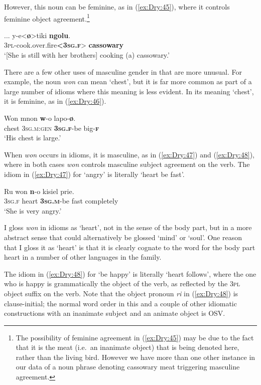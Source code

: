 \documentclass[output=collectionpaper]{langsci/langscibook}
\begin{document}
However, this noun can be feminine, as in (\ref{ex:Dry:45}), where it controls feminine object agreement.\footnote{The possibility of feminine agreement in (\ref{ex:Dry:45}) may be due to the fact that it is the meat (i.e.\ an inanimate object) that is being denoted here, rather than the living bird. However we have more than one other instance in our data of a noun phrase denoting cassowary meat triggering masculine agreement.}

\ea \label{ex:Dry:45}
\gll ...	y-e<\textbf{ø}>tiki	\textbf{ngolu}.\\
{} \textsc{3pl}-cook.over.fire\textbf{<\textsc{3sg.f}}> \textbf{cassowary}\\
\glt `[She is still with her brothers] cooking (a) cassowary.'
\z

There are a few other uses of masculine gender in  that are more unusual. For example, the noun \textit{won} can mean `chest', but it is far more common as part of a large number of idioms where this meaning is less evident. In its meaning `chest', it is feminine, as in (\ref{ex:Dry:46}).

\ea \label{ex:Dry:46}
\gll Won	mnon	\textbf{w}-o	lapo-\textbf{ø}.\\
chest \textsc{3sg.m:gen} \textbf{\textsc{3sg.f}}-be big-\textbf{\textsc{f}}\\
\glt `His chest is large.'
\z

When \textit{won} occurs in idioms, it is masculine, as in (\ref{ex:Dry:47}) and (\ref{ex:Dry:48}), where in both cases \textit{won} controls masculine subject agreement on the verb. The idiom in (\ref{ex:Dry:47}) for `angry' is literally `heart be fast'.

\ea \label{ex:Dry:47}
\gll Ru	won	\textbf{n}-o	kisiel	prie.\\
\textsc{3sg.f} heart \textbf{\textsc{3sg.m}}-be fast completely\\
\glt `She is very angry.'
\z

I gloss \textit{won} in idioms as `heart', not in the sense of the body part, but in a more abstract sense that could alternatively be glossed `mind' or `soul'. One reason that I gloss it as `heart' is that it is clearly cognate to the word for the body part heart in a number of other languages in the  family.

The idiom in (\ref{ex:Dry:48}) for `be happy' is literally `heart follows', where the one who is happy is grammatically the object of the verb, as reflected by the \textsc{3pl} object suffix on the verb. Note that the object pronoun \textit{ri} in (\ref{ex:Dry:48}) is clause-initial; the normal word order in this and a couple of other idiomatic constructions with an inanimate subject and an animate object is OSV.
\end{document}
